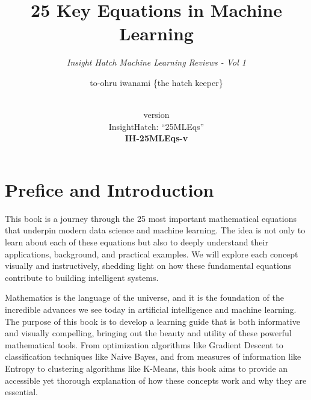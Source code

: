 \documentclass[
  12 pt,
  a4paper,
]{book}
\title{25 Key Equations in Machine Learning}
\subtitle{\textit{Insight Hatch Machine Learning Reviews - Vol 1}}
\author{to-ohru iwanami \{the hatch keeper\}}
\date{\vhCurrentDate\\
version \vhCurrentVersion\\
InsightHatch: ``25MLEqs''\\
\textbf{IH-25MLEqs-v}\textbf{\vhCurrentVersion}}
\numberwithin{equation}{section}
\theoremstyle{plain}      %
\theoremstyle{definition} %
\theoremstyle{remark}     %
\theoremstyle{note}         %
\begin{document}
\frontmatter
\maketitle

{
\setcounter{tocdepth}{1}
\tableofcontents
}
\mainmatter
\hfill\break

\begin{versionhistory}
\end{versionhistory}
\newpage

\setcounter{table}{0}

\frontmatter

\hypertarget{prefice-and-introduction}{%
\chapter{Prefice and Introduction}\label{prefice-and-introduction}}

This book is a journey through the 25 most important mathematical
equations that underpin modern data science and machine learning. The
idea is not only to learn about each of these equations but also to
deeply understand their applications, background, and practical
examples. We will explore each concept visually and instructively,
shedding light on how these fundamental equations contribute to building
intelligent systems.

Mathematics is the language of the universe, and it is the foundation of
the incredible advances we see today in artificial intelligence and
machine learning. The purpose of this book is to develop a learning
guide that is both informative and visually compelling, bringing out the
beauty and utility of these powerful mathematical tools. From
optimization algorithms like Gradient Descent to classification
techniques like Naive Bayes, and from measures of information like
Entropy to clustering algorithms like K-Means, this book aims to provide
an accessible yet thorough explanation of how these concepts work and
why they are essential.
\end{document}
